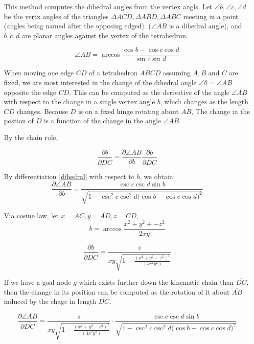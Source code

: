 \documentclass[11pt]{article}
\begin{document}
This method computes the dihedral angles from the vertex angls. Let $\angle b, \angle c,\angle d$ be the
vertx angles of the triangles $\Delta ACD, \Delta ABD, \Delta ABC$ meeting in a point (angles being named after the opposing edged).
($\angle AB$ is a dihedral angle), and $b,c,d$ are planar angles against the vertex of the
tetrahedron.

\begin{equation}
  \label{dihedral}
 \angle AB =\arccos{\frac{\cos{b} - \cos{c}\cos{d}}{\sin{c}\sin{d}}}
\end{equation}

When moving one edge $CD$ of a tetrahedron $ABCD$ assuming $A,B$ and $C$ are fixed, we are most interested in the change of
the dihedral angle $\angle \theta = \angle AB$ opposite the edge $CD$. This can be computed as the derivative of the angle $\angle AB$
with respect to the change in a single vertex angle $b$, which changes as the length $CD$
changes. Because $D$ is on a fixed hinge rotating about $AB$, The change in the postion of $D$ is a function of the change in
the angle $\angle AB$.

By the chain rule,

\begin{equation}
\frac{\partial \theta }{\partial \overline{DC}}   =  \frac{\partial \angle AB }{\partial b} \frac{\partial b}{\partial \overline{DC}} 
\end{equation}

By differentiation \ref{dihedral} with respect to $b$, we obtain:
\begin{equation}
\frac{\partial \angle AB }{\partial b} =
\frac{\csc{c} \csc{d} \sin{b}}
 {\sqrt{1 - \csc^2{c} \csc^2{d} \big( \cos{b} - \cos{c} \cos{d}\big)^2}}
\end{equation}

Via cosine law, let $x = \overline{AC}, y = \overline{AD}, z = \overline{CD}$,
\[
b = \arccos{\frac{x^2 + y^2 + -z^2}{2xy}}
\]

\[
\frac{\partial b}{\partial \overline{DC}} = \frac{z}{x y \sqrt{1 -
    \frac{(x^2 + y^2 - z^2)^2}{(4 x^2 y^2)}}}
\]


If we have a goal node $g$ which exists further down the kinematic chain than $\overline{DC}$, then
the change in its position can be computed as the rotation of it about $\overline{AB}$ induced by the
chage in length $\overline{DC}$.

\begin{equation}
\frac{\partial \angle AB }{\partial \overline{DC}}  =
\frac{z}{x y \sqrt{1 -
    \frac{(x^2 + y^2 - z^2)^2}{(4 x^2 y^2)}}}
\cdot
\frac{\csc{c} \csc{d} \sin{b}}
 {\sqrt{1 - \csc^2{c} \csc^2{d} \big( \cos{b} - \cos{c} \cos{d}\big)^2}}
\end{equation}
\end{document}
